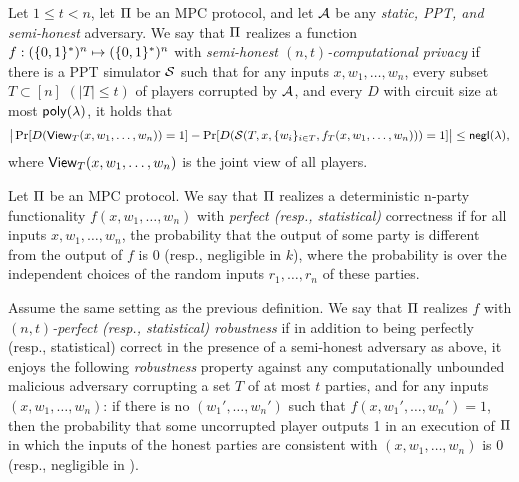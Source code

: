 \begin{definition}\label{def:t-privacy}
Let $1\leq t<n$, let $\mathrm{\Pi}$ be an MPC protocol, and let $\mathcal{A}$ be any {\em static, PPT, and semi-honest} adversary. We say that $\mathrm{\Pi}$ realizes a function $f:(\{0,1\}^*)^n \mapsto (\{0,1\}^*)^n$ with {\em semi-honest $(n,t)$-computational privacy} if there is a PPT simulator $\mathcal{S}$ such that for any inputs $x,w_1,\dots,w_n$, every subset $T \subset [n]$ $(|T| \leq t)$ of players corrupted by $\mathcal{A}$, and every $D$ with circuit size at most $\mathsf{poly(\lambda)}$, it holds that 
{\fontsize{10.5pt}{0pt}\selectfont
\begin{equation}
\big|\Pr[D(\mathsf{View}_T(x,w_1,\dots,w_n)) =1]- \Pr[D(\mathcal{S}(T,x,\{w_i\}_{i \in T},f_T(x,w_1,\dots,w_n)))=1]\big| \leq \mathsf{negl}(\lambda),
\end{equation}}
where $\mathsf{View}_T(x,w_1,\dots,w_n)$ is the joint view of all players.
\end{definition} 


\begin{definition}\label{def:MPC-correctness}
Let $\mathrm{\Pi}$ be an MPC protocol. We say that $\mathrm{\Pi}$ realizes a deterministic n-party functionality $f(x,w_1,\dots,w_n)$ with {\em perfect (resp., statistical)} correctness if for all inputs $x,w_1,\dots,w_n$, the probability that the output of some party is different from the output of $f$ is 0 (resp., negligible in $k$), where the probability is over the independent choices of the random inputs $r_1,\dots,r_n$ of these parties.   
\end{definition}



\begin{definition} \label{def:t-robustness}
Assume the same setting as the previous definition. We say that $\mathrm{\Pi}$ realizes $f$ with {\em $(n,t)$-perfect (resp., statistical) robustness} if in addition to being perfectly (resp., statistical) correct in the presence of a semi-honest adversary as above, it enjoys the following {\em robustness} property against any computationally unbounded malicious adversary corrupting a set $T$ of at most $t$ parties, and for any inputs $(x,w_1,\dots,w_n)$: if there is no $(w_1',\dots,w_n')$ such that $f(x,w_1',\dots,w_n')=1$, then the probability that some uncorrupted player outputs 1 in an execution of $\mathrm{\Pi}$ in which the inputs of the honest parties are consistent with $(x,w_1,\dots,w_n)$ is 0 (resp., negligible in \SecPar).    
\end{definition}


